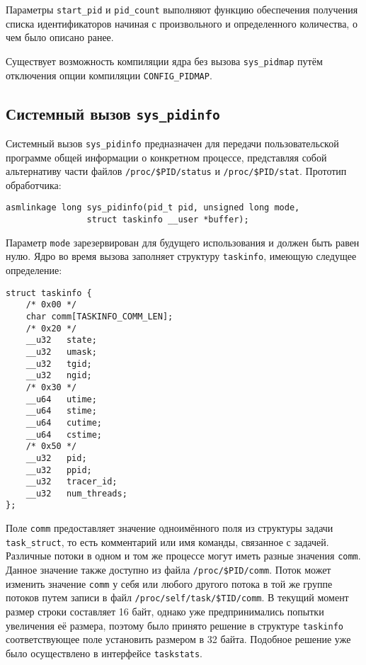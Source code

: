 Параметры \texttt{start\_pid} и \texttt{pid\_count} выполняют функцию обеспечения
получения списка идентификаторов начиная с произвольного и определенного
количества, о чем было описано ранее.

Существует возможность компиляции ядра без вызова \texttt{sys\_pidmap} путём
отключения опции компиляции \texttt{CONFIG\_PIDMAP}.

\subsection{Системный вызов \texttt{sys\_pidinfo}}

Системный вызов \texttt{sys\_pidinfo} предназначен для передачи пользовательской
программе общей информации о конкретном процессе, представляя собой альтернативу
части файлов \texttt{/proc/\$PID/status} и \texttt{/proc/\$PID/stat}. Прототип
обработчика:

\medskip
\begin{lstlisting}[style=cstyle]
asmlinkage long sys_pidinfo(pid_t pid, unsigned long mode,
			    struct taskinfo __user *buffer);
\end{lstlisting}
\medskip

Параметр \texttt{mode} зарезервирован для будущего использования и должен быть
равен нулю. Ядро во время вызова заполняет структуру \texttt{taskinfo}, имеющую
следущее определение:

\medskip
\begin{lstlisting}[style=cstyle]
struct taskinfo {
	/* 0x00 */
	char comm[TASKINFO_COMM_LEN];
	/* 0x20 */
	__u32	state;
	__u32	umask;
	__u32	tgid;
	__u32	ngid;
	/* 0x30 */
	__u64	utime;
	__u64	stime;
	__u64	cutime;
	__u64	cstime;
	/* 0x50 */
	__u32	pid;
	__u32	ppid;
	__u32	tracer_id;
	__u32	num_threads;
};
\end{lstlisting}
\medskip

Поле \texttt{comm} предоставляет значение одноимённого поля из структуры задачи
\texttt{task\_struct}, то есть комментарий или имя команды, связанное с
задачей. Различные потоки в одном и том же процессе могут иметь разные значения
\texttt{comm}. Данное значение также доступно из файла
\texttt{/proc/\$PID/comm}. Поток может изменить значение \texttt{comm} у себя
или любого другого потока в той же группе потоков путем записи в файл
\texttt{/proc/self/task/\$TID/comm}. В текущий момент размер строки составляет
16 байт, однако уже предпринимались попытки увеличения её размера, поэтому было
принято решение в структуре \texttt{taskinfo} соответствующее поле установить
размером в 32 байта. Подобное решение уже было осуществлено в интерфейсе
\texttt{taskstats}.

